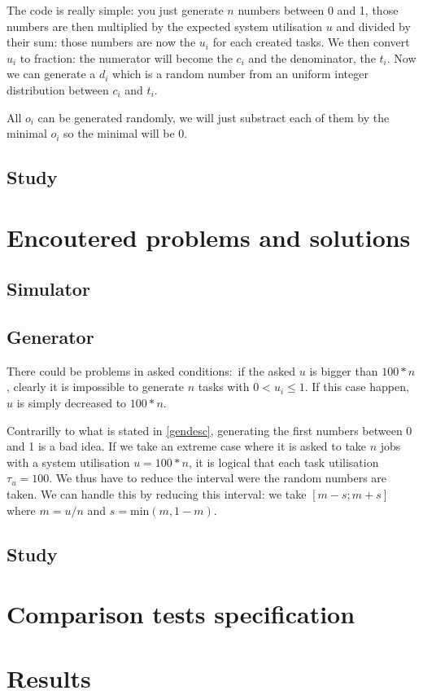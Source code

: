 \documentclass{scrartcl}
\begin{document}
The code is really simple: you just generate $n$ numbers between 0 and 1, those numbers are then multiplied by the expected system utilisation $u$ and divided by their sum: those numbers are now the $u_i$ for each created tasks.
We then convert $u_i$ to fraction: the numerator will become the $c_i$ and the denominator, the $t_i$. Now we can generate a $d_i$ which is a random number from an uniform integer distribution between $c_i$ and $t_i$.

All $o_i$ can be generated randomly, we will just substract each of them by the minimal $o_i$ so the minimal will be 0.

\subsection{Study}

\section{Encoutered problems and solutions}

\subsection{Simulator}

\subsection{Generator}
There could be problems in asked conditions: if the asked $u$ is bigger than $100 * n$, clearly it is impossible to generate $n$ tasks with $0 < u_i \leq 1$. If this case happen, $u$ is simply decreased to $100 * n$.

Contrarilly to what is stated in \ref{gendesc}, generating the first numbers between 0 and 1 is a bad idea.
If we take an extreme case where it is asked to take $n$ jobs with a system utilisation $u = 100 * n$, it is logical that each task utilisation $\tau_u = 100$.
We thus have to reduce the interval were the random numbers are taken.
We can handle this by reducing this interval: we take $[m - s; m + s]$ where $m = u / n$ and $s = \text{min}(m, 1-m)$.


\subsection{Study}

\section{Comparison tests specification}

\section{Results}
\end{document}
